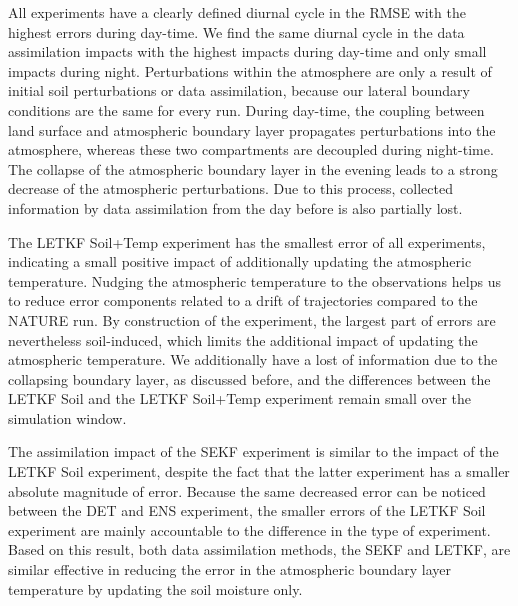 \documentclass[hess, manuscript]{copernicus}
\begin{document}
All experiments have a clearly defined diurnal cycle in the RMSE with the highest errors during day-time.
We find the same diurnal cycle in the data assimilation impacts with the highest impacts during day-time and only small impacts during night.
Perturbations within the atmosphere are only a result of initial soil perturbations or data assimilation, because our lateral boundary conditions are the same for every run.
During day-time, the coupling between land surface and atmospheric boundary layer propagates perturbations into the atmosphere, whereas these two compartments are decoupled during night-time. 
The collapse of the atmospheric boundary layer in the evening leads to a strong decrease of the atmospheric perturbations.
Due to this process, collected information by data assimilation from the day before is also partially lost.

The LETKF Soil+Temp experiment has the smallest error of all experiments, indicating a small positive impact of additionally updating the atmospheric temperature.
Nudging the atmospheric temperature to the observations helps us to reduce error components related to a drift of trajectories compared to the NATURE run.
By construction of the experiment, the largest part of errors are nevertheless soil-induced, which limits the additional impact of updating the atmospheric temperature.
We additionally have a lost of information due to the collapsing boundary layer, as discussed before, and the differences between the LETKF Soil and the LETKF Soil+Temp experiment remain small over the simulation window.

The assimilation impact of the SEKF experiment is similar to the impact of the LETKF Soil experiment, despite the fact that the latter experiment has a smaller absolute magnitude of error.
Because the same decreased error can be noticed between the DET and ENS experiment, the smaller errors of the LETKF Soil experiment are mainly accountable to the difference in the type of experiment.
Based on this result, both data assimilation methods, the SEKF and LETKF, are similar effective in reducing the error in the atmospheric boundary layer temperature by updating the soil moisture only.\\
\end{document}
